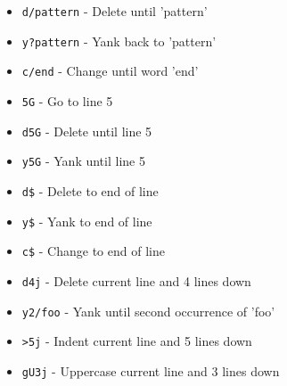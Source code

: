 \documentclass[6pt,landscape]{article}
\newcommand{\key}[1]{\texttt{#1}}
\begin{document}
\begin{multicols*}{5}
\begin{itemize}[leftmargin=*,itemsep=0pt,parsep=0pt,topsep=0pt]
\item \key{d/pattern} - Delete until 'pattern'
\item \key{y?pattern} - Yank back to 'pattern'
\item \key{c/end} - Change until word 'end'

\item \key{5G} - Go to line 5
\item \key{d5G} - Delete until line 5
\item \key{y5G} - Yank until line 5
\item \key{d\$} - Delete to end of line
\item \key{y\$} - Yank to end of line
\item \key{c\$} - Change to end of line

\item \key{d4j} - Delete current line and 4 lines down
\item \key{y2/foo} - Yank until second occurrence of 'foo'
\item \key{>5j} - Indent current line and 5 lines down
\item \key{gU3j} - Uppercase current line and 3 lines down
\end{itemize}


\end{multicols*}
\end{document}
